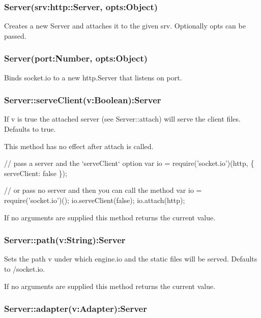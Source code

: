 \subsubsection*{Server(srv\+:http\+::\+Server, opts\+:Object)}

Creates a new {\ttfamily Server} and attaches it to the given {\ttfamily srv}. Optionally {\ttfamily opts} can be passed.

\subsubsection*{Server(port\+:\+Number, opts\+:\+Object)}

Binds socket.\+io to a new {\ttfamily http.\+Server} that listens on {\ttfamily port}.

\subsubsection*{Server\+::serve\+Client(v\+:\+Boolean)\+:Server}

If {\ttfamily v} is {\ttfamily true} the attached server (see {\ttfamily Server\+::attach}) will serve the client files. Defaults to {\ttfamily true}.

This method has no effect after {\ttfamily attach} is called.


\begin{DoxyCode}
// pass a server and the `serveClient` option
var io = require('socket.io')(http, \{ serveClient: false \});

// or pass no server and then you can call the method
var io = require('socket.io')();
io.serveClient(false);
io.attach(http);
\end{DoxyCode}


If no arguments are supplied this method returns the current value.

\subsubsection*{Server\+::path(v\+:\+String)\+:Server}

Sets the path {\ttfamily v} under which {\ttfamily engine.\+io} and the static files will be served. Defaults to {\ttfamily /socket.io}.

If no arguments are supplied this method returns the current value.

\subsubsection*{Server\+::adapter(v\+:\+Adapter)\+:Server}

